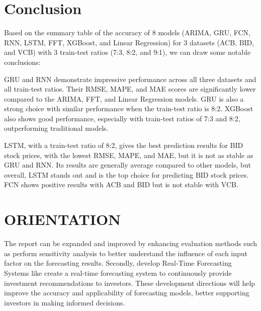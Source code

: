 \documentclass{ieeeojies}
\begin{document}
\section{Conclusion}
Based on the summary table of the accuracy of 8 models (ARIMA, GRU, FCN, RNN, LSTM, FFT, XGBoost, and Linear Regression) for 3 datasets (ACB, BID, and VCB) with 3 train-test ratios (7:3, 8:2, and 9:1), we can draw some notable conclusions:

GRU and RNN demonstrate impressive performance across all three datasets and all train-test ratios. Their RMSE, MAPE, and MAE scores are significantly lower compared to the ARIMA, FFT, and Linear Regression models. GRU is also a strong choice with similar performance when the train-test ratio is 8:2. XGBoost also shows good performance, especially with train-test ratios of 7:3 and 8:2, outperforming traditional models.

LSTM, with a train-test ratio of 8:2, gives the best prediction results for BID stock prices, with the lowest RMSE, MAPE, and MAE, but it is not as stable as GRU and RNN. Its results are generally average compared to other models, but overall, LSTM stands out and is the top choice for predicting BID stock prices. FCN shows positive results with ACB and BID but is not stable with VCB.
\section{ORIENTATION}
The report can be expanded and improved by enhancing evaluation methods such as  perform sensitivity analysis to better understand the influence of each input factor on the forecasting results. Secondly, develop Real-Time Forecasting Systems like create a real-time forecasting system to continuously provide investment recommendations to investors. These development directions will help improve the accuracy and applicability of forecasting models, better supporting investors in making informed decisions.
\end{document}
